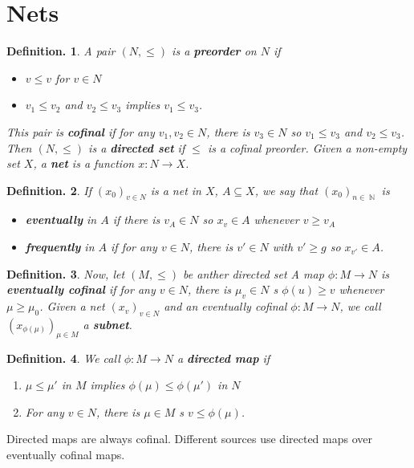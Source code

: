 \documentclass[11pt, a4paper]{memoir}
\DeclareMathOperator{\N}{{\mathbb{N}}}
\theoremstyle{change}
\theoremstyle{plain}
\theoremstyle{nonumberplain}
\newtheorem{definition}{Definition.}
\numberwithin{equation}{section}
\begin{document}
\section{Nets}
\begin{definition}
    A pair $(N,\leq)$ is a \textbf{preorder} on $N$ if
    \begin{itemize}[nl]
        \item $v\leq v$ for $v\in N$
        \item $v_1\leq v_2$ and $v_2\leq v_3$ implies $v_1\leq v_3$.
    \end{itemize}
    This pair is \textbf{cofinal} if for any $v_1,v_2\in N$, there is $v_3\in N$ so $v_1\leq v_3$ and $v_2\leq v_3$.
    Then $(N,\leq)$ is a \textbf{directed set} if $\leq$ is a cofinal preorder.
    Given a non-empty set $X$, a \textbf{net} is a function $x:N\to X$.
\end{definition}
\begin{definition}
    If $(x_0)_{v\in N}$ is a net in $X$, $A\subseteq X$, we say that $(x_0)_{n\in\N}$ is
    \begin{itemize}[nl]
        \item \textbf{eventually} in $A$ if there is $v_A\in N$ so $x_v\in A$ whenever $v\geq v_A$
        \item \textbf{frequently} in $A$ if for any $v\in N$, there is $v'\in N$ with $v'\geq g$ so $x_{v'}\in A$.
    \end{itemize}
\end{definition}
\begin{definition}
    Now, let $(M,\leq)$ be anther directed set
    A map $\phi:M\to N$ is \textbf{eventually cofinal} if for any $v\in N$, there is $\mu_v\in N$ s $\phi(u)\geq v$ whenever $\mu\geq \mu_0$.
    Given a net $(x_v)_{v\in N}$ and an eventually cofinal $\phi:M\to N$, we call $(x_{\phi(\mu)})_{\mu\in M}$ a \textbf{subnet}.
\end{definition}
\begin{definition}
    We call $\phi:M\to N$ a \textbf{directed map} if
    \begin{enumerate}[nl,r]
        \item $\mu\leq \mu'$ in $M$ implies $\phi(\mu)\leq\phi(\mu')$ in $N$
        \item For any $v\in N$, there is $\mu\in M$ s $v\leq\phi(\mu)$.
    \end{enumerate}
\end{definition}
Directed maps are always cofinal.
Different sources use directed maps over eventually cofinal maps.
\end{document}
